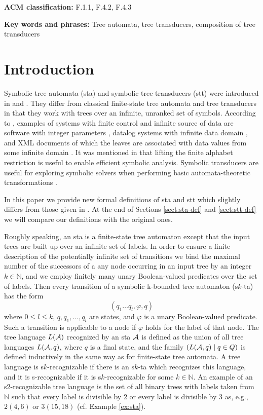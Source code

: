 \documentclass[10pt]{scrartcl}
\newcommand{\nat}{\mathbb{N}}
\newcommand{\A}{{\cal A}}
\begin{document}
{\bf ACM classification:} F.1.1, F.4.2, F.4.3

{\bf Key words and phrases:} Tree automata, tree transducers, composition of tree transducers


\section{Introduction}

\label{introduction} Symbolic tree automata (sta) and symbolic tree transducers (stt) were introduced in \cite{veabjo11a} and \cite{veabjo11b}. They differ from classical finite-state tree automata and tree transducers \cite{gecste84,gecste97} in that they work with trees over an infinite, unranked set of symbols. 
According to \cite{grukupshe10}, examples of systems with finite control and infinite source of data are software with integer parameters \cite{bouhabmay03}, datalog systems with infinite data domain \cite{bouhabjursig07}, and XML documents of which the leaves are associated with data values from some infinite domain
\cite{bracercomframan03}. It was mentioned in \cite{veabjo11a} that lifting the finite alphabet restriction is useful to enable efficient symbolic analysis. Symbolic transducers are useful for exploring symbolic solvers when performing basic automata-theoretic transformations \cite{veahoolivmolbjo12}. 

In this paper we provide new formal definitions of sta and stt which slightly differs from those given in \cite{veabjo11a,veabjo11b}. At the end of Sections \ref{sect:sta-def} and \ref{sect:stt-def} we will compare our definitions with the original ones.


Roughly speaking, an sta is a finite-state tree automaton \cite{don70}  except that the input trees are built up over an infinite set of labels. In order to ensure a finite description of the potentially infinite set of transitions we bind the maximal number of the successors of a any node
occurring in an input tree by an integer $k\in \nat$, and we employ finitely many unary Boolean-valued predicates over the set of labels.  Then every transition of a symbolic k-bounded tree automaton (s$k$-ta) has the form 
\[
(q_1 \ldots q_l , \varphi, q)
\]
where $0\le l\le k$, $q,q_1,\ldots,q_l$ are states, and $\varphi$ is a unary Boolean-valued predicate. Such a transition is applicable to a node if $\varphi$ holds for the label of that node.
The tree language $L(\A)$ recognized by an sta $\A$ is defined as the union of all tree languages $L(\A,q)$, where $q$ is a final state, and the family $(L(\A,q)\mid q \in Q)$ is defined inductively in the same way as for finite-state tree automata. A tree language is s$k$-recognizable if there is an s$k$-ta which recognizes this language, and it is s-recognizable if it is s$k$-recognizable for some $k\in \nat$.
An example of an s2-recognizable tree language is 
the set of all binary trees with labels taken from $\mathbb{N}$ such that every label is divisible by 2 or every label is divisible by 3 as, e.g., $2(4,6)$ or $3(15,18)$ (cf. Example \ref{ex:sta}).  
\end{document}
